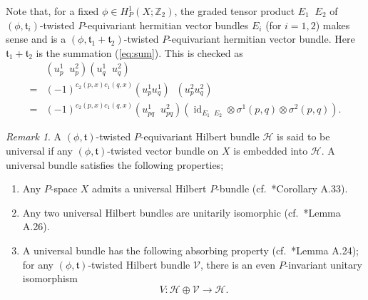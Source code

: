 \documentclass[11pt]{amsart}
\theoremstyle{definition}
\theoremstyle{plain}
\theoremstyle{remark}
\newtheorem{rmk}[equation]{Remark}
\DeclareMathOperator{\id}{id}
\newcommand{\bZ}{\mathbb{Z}}
\newcommand{\cH}{\mathcal{H}}
\newcommand{\cV}{\mathcal{V}}
\newcommand{\ft}{\mathfrak{t}}
\DeclareMathOperator{\hotimes}{\hat{\otimes}}
\begin{document}
Note that, for a fixed $\phi \in H^1_P(X;\bZ_2)$, the graded tensor product $E_1 \hotimes E_2$ of $(\phi,\ft_i)$-twisted $P$-equivariant hermitian vector bundles $E_i$ (for $i=1,2$) makes sense and is a $(\phi,\ft_1 + \ft_2)$-twisted $P$-equivariant hermitian vector bundle. Here $\ft_1 + \ft_2$ is the summation (\ref{eq:sum}). This is checked as
\begin{align*}
& (u_p^1 \hotimes u_p^2)(u_q^1 \hotimes u_q^2) \\
=& (-1)^{c_2(p,x)c_1(q,x)}(u_p^1u_q^1) \hotimes (u_p^2u_q^2) \\
  =& (-1)^{c_2(p,x)c_1(q,x)} (u_{pq}^1 \hotimes u_{pq}^2) (\id_{E_1 \hotimes E_2} \otimes \sigma^1(p,q) \otimes \sigma^2(p,q)). 
\end{align*}

\begin{rmk}\label{rmk:univ}
A $(\phi, \ft )$-twisted $P$-equivariant Hilbert bundle $\cH$ is said to be universal if any $(\phi , \ft )$-twisted vector bundle on $X$ is embedded into $\cH$. A universal bundle satisfies the following properties;
\begin{enumerate}
\item Any $P$-space $X$ admits a universal Hilbert $P$-bundle (cf.\ \cite{freedLoopGroupsTwisted2011}*{Corollary A.33}).
\item Any two universal Hilbert bundles are unitarily isomorphic (cf.\ \cite{freedLoopGroupsTwisted2011}*{Lemma A.26}). 
\item A universal bundle has the following absorbing property (cf.\ \cite{freedLoopGroupsTwisted2011}*{Lemma A.24}); for any $(\phi,\ft)$-twisted Hilbert bundle $\cV$, there is an even $P$-invariant unitary isomorphism
\[ V \colon \cH \oplus \cV \to \cH. \]
\end{enumerate}
\end{rmk}
\end{document}

